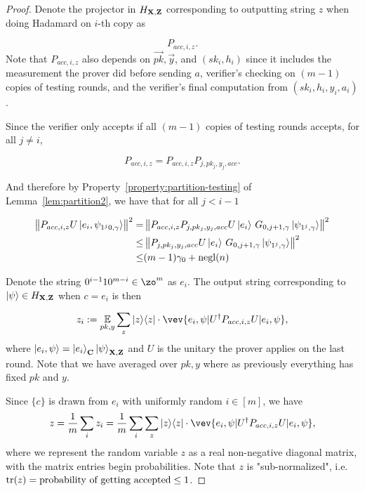 \begin{proof}
Denote the projector in $H_{\mathbf{X},\mathbf{Z}}$ corresponding to outputting string $z$ when doing Hadamard on $i$-th copy as

$$P_{acc,i,z}.$$
Note that $P_{acc,i,z}$ also depends on $\vec{pk}, \vec{y}$, and $(sk_i, h_i)$ since it includes the measurement the prover did before sending $a$,  verifier's checking on $(m-1)$ copies of testing rounds, and  the verifier's final computation from $(sk_i,h_i,y_i,a_i)$.

Since the verifier only accepts if all $(m-1)$ copies of testing rounds accepts, for all $j\neq i$,

$$P_{acc,i,z}=P_{acc,i,z}P_{j,pk_j,y_j,acc}.$$

And therefore by Property~\ref{property:partition-testing} of Lemma~\ref{lem:partition2}, we have that for all $j <i-1$

\begin{align} \label{eq:rejected-d}
    \left\lVert P_{acc,i,z} U \ket{e_i, \psi_{1^j0,\gamma}}\right\rVert^2
    =& \left\lVert P_{acc,i,z}P_{j,pk_j,y_j,acc} U \ket{e_i}\, G_{0,j+1,\gamma}\ket{\psi_{1^j,\gamma}}  \right\rVert^2 \nonumber \\
    \leq& \left\lVert P_{j,pk_j,y_j,acc} U \ket{e_i}\, G_{0,j+1,\gamma}\ket{\psi_{1^j,\gamma}}  \right\rVert^2 \nonumber \\
    \leq& (m-1)\gamma_0+\operatorname{negl}(n) 
\end{align}


Denote the string $0^{i-1}10^{m-i} \in \zo^m $ as $e_i$. The output string corresponding to $\ket{\psi} \in H_{\mathbf{X},\mathbf{Z}}$ when $c=e_i$ is then 




$$z_i\defeq \E_{pk,y} \sum_z \proj{z} \cdot \vev{e_i,\psi|U^\dag P_{acc,i,z} U|e_i,\psi},$$
where $\ket{e_i,\psi}=\ket{e_i}_{\mathbf{C}}\ket{\psi}_{\mathbf{X},\mathbf{Z}}$ and $U$ is the unitary the prover applies on the last round. Note that we have averaged over $pk, y$ where as previously everything has fixed $pk$ and $y$. 

Since $\{c\}$ is drawn  from $e_i$ with uniformly random $i\in [m]$, we have 
$$ z=\frac{1}{m} \sum_i z_i= \frac{1}{m} \sum_i \sum_z \proj{z} \cdot \vev{e_i,\psi|U^\dag P_{acc,i,z} U|e_i,\psi},$$ 
	where we represent the random variable $z$ as a real non-negative diagonal matrix, with the matrix entries begin probabilities. Note that $z$ is "sub-normalized", i.e. $\operatorname{tr} (z)= \text{probability of getting accepted} \leq 1$.







\end{proof}
